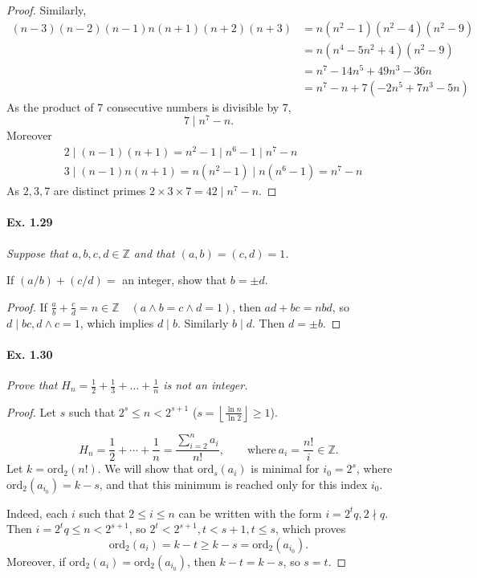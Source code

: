 \documentclass[11pt,a4paper]{article}
\newcommand{\Z}{\mathbb{Z}}
\newcommand{\ord}{\mathrm{ord}}
\begin{document}
{\begin{proof}
Similarly,
\begin{align*}
(n-3)(n-2)(n-1)n(n+1)(n+2)(n+3) &= n(n^2-1)(n^2-4)(n^2-9)\\
&=n(n^4-5n^2+4)(n^2-9)\\
&=n^7-14n^5+49n^3-36n\\
&=n^7-n + 7(-2n^5+7n^3-5n)
\end{align*}
As the product of 7 consecutive numbers is divisible by 7,
$$7 \mid n^7 -n.$$
Moreover
\begin{align*}
&2 \mid (n-1)(n+1) = n^2 -  1 \mid n^6 - 1 \mid n^7 -n\\
&3 \mid (n-1)n(n+1) = n(n^2 - 1) \mid n(n^6-1) = n^7 - n
\end{align*}
As $2,3,7$ are distinct primes $2\times 3 \times 7 = 42 \mid n^7-n$.
\end{proof}

\paragraph{Ex. 1.29}

{\it  Suppose that $a, b, c, d \in \Z$ and that $(a, b) = (c, d) =
1$. 

If $(a/b) + (c/d) =$ an integer, show that $b = \pm d$.
}

\begin{proof}
If $\frac{a}{b}+ \frac{c}{d} = n \in \Z\quad (a\wedge b = c\wedge d = 1)$, then $ad+bc = nbd$, so $d \mid bc, d\wedge c=1$, which implies $d\mid b$. Similarly $b \mid d$. Then $d =\pm b$.
\end{proof}

\paragraph{Ex. 1.30}

{\it
Prove that  $H_n = \frac{1}{2} + \frac{1}{3} + \ldots + \frac{1}{n}$
is not an integer.
}

\begin{proof}
Let $s$ such that $2^{s} \leq n < 2^{s+1}$ ($s = \left \lfloor \frac{\ln n}{\ln 2} \right \rfloor \geq 1$).

$$H_n = \frac{1}{2} + \cdots + \frac{1}{n} = \frac{\sum_{i=2}^n a_i}{n!}, \qquad \mathrm{where}\ a_i = \frac{n!}{i} \in \Z.$$
Let $k = \ord_2(n!)$.
We will show that $\ord_s(a_i)$ is minimal for $i_0 = 2^s$, where $\ord_2(a_{i_0}) = k - s$, and that this minimum is reached only for this index $i_0$.

Indeed, each $i$ such that $2 \leq i \leq n$ can be written with the form $i = 2^tq, 2 \nmid q$. Then $i = 2^t q \leq n < 2^{s+1}$, so $2^t < 2^{s+1}, t < s+1, t \leq s$, which proves
$$\ord_2(a_i) = k - t \geq k - s = \ord_2(a_{i_0}).$$
Moreover, if $\ord_2(a_i) = \ord_2(a_{i_0})$, then $k - t = k - s$, so $s = t$.


\end{proof}}
\end{document}
